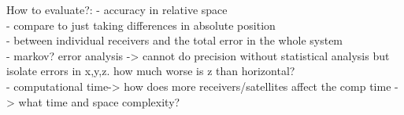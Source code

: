 How to evaluate?:
- accuracy in relative space\\
- compare to just taking differences in absolute position \\
- between individual receivers and the total error in the whole system\\
- markov? error analysis -> cannot do precision without statistical analysis but isolate errors in x,y,z. how much worse is z than horizontal?\\
- computational time-> how does more receivers/satellites affect the comp time -> what time and space complexity?

